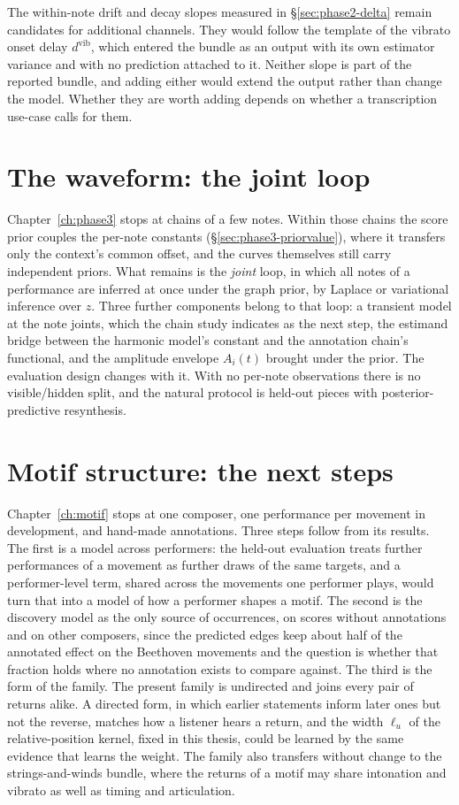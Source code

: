 The within-note drift and decay slopes measured in \S\ref{sec:phase2-delta}
remain candidates for additional channels. They would follow the template of
the vibrato onset delay $d^{\mathrm{vib}}$, which entered the bundle as an
output with its own estimator variance and with no prediction attached to
it. Neither slope is part of the reported bundle, and adding either would
extend the output rather than change the model. Whether they are worth
adding depends on whether a transcription use-case calls for them.

\section{The waveform: the joint loop}
\label{sec:future-phase3}Chapter~\ref{ch:phase3} stops at chains of a few
notes. Within those chains the score prior couples the per-note constants
(\S\ref{sec:phase3-priorvalue}), where it transfers only the context's
common offset, and the curves themselves still carry independent priors.
What remains is the \emph{joint} loop, in which all notes of a performance
are inferred at once under the graph prior, by Laplace or variational
inference over $z$. Three further components belong to that loop: a
transient model at the note joints, which the chain study indicates as the
next step, the estimand bridge between the harmonic model's constant and the
annotation chain's functional, and the amplitude envelope $A_i(t)$ brought
under the prior. The evaluation design changes with it. With no per-note
observations there is no visible/hidden split, and the natural protocol is
held-out pieces with posterior-predictive resynthesis.

\section{Motif structure: the next steps}\label{sec:future-motif}
Chapter~\ref{ch:motif} stops at one composer, one performance per movement
in development, and hand-made annotations. Three steps follow from its
results. The first is a model across performers: the held-out evaluation
treats further performances of a movement as further draws of the same
targets, and a performer-level term, shared across the movements one
performer plays, would turn that into a model of how a performer shapes a
motif. The second is the discovery model as the only source of
occurrences, on scores without annotations and on other composers, since
the predicted edges keep about half of the annotated effect on the
Beethoven movements and the question is whether that fraction holds where
no annotation exists to compare against. The third is the form of the
family. The present family is undirected and joins every pair of returns
alike. A directed form, in which earlier statements inform later ones but
not the reverse, matches how a listener hears a return, and the width
$\ell_u$ of the relative-position kernel, fixed in this thesis, could be
learned by the same evidence that learns the weight. The family also
transfers without change to the strings-and-winds bundle, where the
returns of a motif may share intonation and vibrato as well as timing and
articulation.

